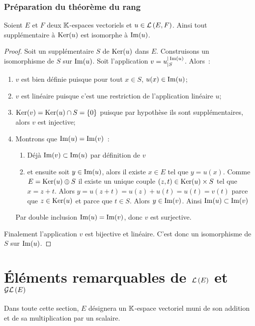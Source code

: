 \subsubsection{Préparation du théorème du rang}

\begin{theo}\label{theo:preptheorang}
  Soient \(E\) et \(F\) deux \(\mathbb{K}\)-espaces vectoriels et \(u \in \mathcal{L}\left(E,F\right)\). Ainsi tout supplémentaire à \(\operatorname{Ker}(u)\) est isomorphe à \(\operatorname{Im}(u)\).
\end{theo}
\begin{proof}
  Soit un supplémentaire \(S\) de \(\operatorname{Ker}(u)\) dans \(E\). Construisons un isomorphisme de \(S\) sur \(\operatorname{Im}(u)\). Soit l'application \(v=u_{|S}^{|\operatorname{Im}(u)}\). Alors~:
  \begin{enumerate}
  \item \(v\) est bien définie puisque pour tout \(x \in S\), \(u(x) \in \operatorname{Im}(u)\);
  \item \(v\) est linéaire puisque c'est une restriction de l'application linéaire \(u\);
  \item \(\operatorname{Ker}(v)=\operatorname{Ker}(u) \cap S =\{0\}\) puisque par hypothèse ils sont supplémentaires, alors \(v\) est injective;
  \item Montrons que \(\operatorname{Im}(u)=\operatorname{Im}(v)\)~:
    \begin{enumerate}
    \item Déjà \(\operatorname{Im}(v) \subset \operatorname{Im}(u)\) par définition de \(v\)
    \item et ensuite soit \(y \in \operatorname{Im}(u)\), alors il existe \(x \in E\) tel que \(y=u(x)\). Comme \(E=\operatorname{Ker}(u) \oplus S\) il existe un unique couple \((z,t) \in \operatorname{Ker}(u) \times S\) tel que \(x=z+t\). Alors \(y=u(z+t)=u(z)+u(t)=u(t)=v(t)\) parce que \(z \in \operatorname{Ker}(u)\) et parce que \(t \in S\). Alors \(y \in \operatorname{Im}(v)\). Ainsi \(\operatorname{Im}(u) \subset \operatorname{Im}(v)\)
    \end{enumerate}
    Par double inclusion \(\operatorname{Im}(u)=\operatorname{Im}(v)\), donc \(v\) est surjective.
  \end{enumerate}
  Finalement l'application \(v\) est bijective et linéaire. C'est donc un isomorphisme de \(S\) sur \(\operatorname{Im}(u)\).
\end{proof}

\section{Éléments remarquables de \(\mathcal{L}\left(E\right)\) et \(\mathcal{GL}\left(E\right)\)}
Dans toute cette section, \(E\) désignera un \(\mathbb{K}\)-espace vectoriel muni de son addition et de sa multiplication par un scalaire.
